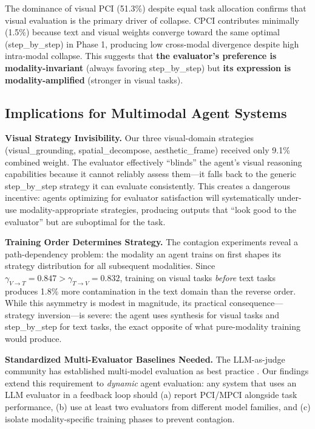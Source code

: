 \documentclass[11pt,a4paper]{article}
\begin{document}
The dominance of visual PCI (51.3\%) despite equal task allocation confirms that visual evaluation is the primary driver of collapse. CPCI contributes minimally (1.5\%) because text and visual weights converge toward the same optimal (step\_by\_step) in Phase 1, producing low cross-modal divergence despite high intra-modal collapse. This suggests that \textbf{the evaluator's preference is modality-invariant} (always favoring step\_by\_step) but \textbf{its expression is modality-amplified} (stronger in visual tasks).

\subsection{Implications for Multimodal Agent Systems}

\textbf{Visual Strategy Invisibility.} Our three visual-domain strategies (visual\_grounding, spatial\_decompose, aesthetic\_frame) received only 9.1\% combined weight. The evaluator effectively ``blinds'' the agent's visual reasoning capabilities because it cannot reliably assess them---it falls back to the generic step\_by\_step strategy it can evaluate consistently. This creates a dangerous incentive: agents optimizing for evaluator satisfaction will systematically under-use modality-appropriate strategies, producing outputs that ``look good to the evaluator'' but are suboptimal for the task.

\textbf{Training Order Determines Strategy.} The contagion experiments reveal a path-dependency problem: the modality an agent trains on first shapes its strategy distribution for all subsequent modalities. Since $\gamma_{V\to T} = 0.847 > \gamma_{T\to V} = 0.832$, training on visual tasks \textit{before} text tasks produces 1.8\% more contamination in the text domain than the reverse order. While this asymmetry is modest in magnitude, its practical consequence---strategy inversion---is severe: the agent uses synthesis for visual tasks and step\_by\_step for text tasks, the exact opposite of what pure-modality training would produce.

\textbf{Standardized Multi-Evaluator Baselines Needed.} The LLM-as-judge community has established multi-model evaluation as best practice \cite{zheng2023judging}. Our findings extend this requirement to \textit{dynamic} agent evaluation: any system that uses an LLM evaluator in a feedback loop should (a) report PCI/MPCI alongside task performance, (b) use at least two evaluators from different model families, and (c) isolate modality-specific training phases to prevent contagion.
\end{document}
